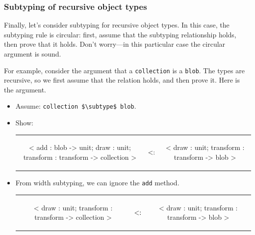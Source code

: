\subsubsection{Subtyping of recursive object types}

Finally, let's consider subtyping for recursive object types.  In this case, the subtyping rule is circular: first, assume that the subtyping relationship holds, then prove that it holds.  Don't worry---in this particular case the circular argument is sound.

For example, consider the argument that a \hbox{\lstinline/collection/} is a \hbox{\lstinline/blob/}.  The types
are recursive, so we first assume that the relation holds, and then prove it.  Here is the argument.

\begin{itemize}
\item Assume: \hbox{\lstinline/collection $\subtype$ blob/}.
\item Show:

\begin{tabular}{ccc}
\begin{minipage}{2in}
\begin{ocamllisting}
< add : blob -> unit;
  draw : unit;
  transform : transform -> collection
>
\end{ocamllisting}
\end{minipage}
&
$\mathrel{\hbox{<:}}$
&
\begin{minipage}{2in}
\begin{ocamllisting}
< draw : unit;
  transform : transform -> blob
>
\end{ocamllisting}
\end{minipage}
\end{tabular}

\item From width subtyping, we can ignore the \hbox{\lstinline/add/} method.

\begin{tabular}{ccc}
\begin{minipage}{2in}
\begin{ocamllisting}
< draw : unit;
  transform : transform -> collection
>
\end{ocamllisting}
\end{minipage}
&
$\mathrel{\hbox{<:}}$
&
\begin{minipage}{2in}
\begin{ocamllisting}
< draw : unit;
  transform : transform -> blob
>
\end{ocamllisting}
\end{minipage}
\end{tabular}


\end{itemize}
